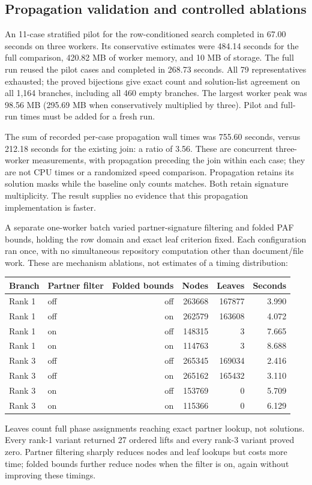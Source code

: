 \documentclass[11pt]{article}
\begin{document}
\subsection{Propagation validation and controlled ablations}
An 11-case stratified pilot for the row-conditioned search completed in
67.00 seconds on three workers. Its conservative estimates were 484.14
seconds for the full comparison, 420.82 MB of worker memory, and 10 MB of
storage. The full run reused the pilot cases and completed in 268.73 seconds.
All 79 representatives exhausted; the proved bijections give exact count
and solution-list agreement on all 1,164 branches, including all 460 empty
branches. The largest worker peak was 98.56 MB (295.69 MB when conservatively
multiplied by three). Pilot and full-run times must be added for a fresh run.

The sum of recorded per-case propagation wall times was 755.60 seconds,
versus 212.18 seconds for the existing join: a ratio of 3.56. These are
concurrent three-worker measurements, with propagation preceding the join
within each case; they are not CPU times or a randomized speed comparison.
Propagation retains its solution masks while the baseline only counts
matches. Both retain signature multiplicity. The result supplies no
evidence that this propagation implementation is faster.

A separate one-worker batch varied partner-signature filtering and folded
PAF bounds, holding the row domain and exact leaf criterion fixed. Each
configuration ran once, with no simultaneous repository computation other
than document/file work. These are mechanism ablations, not estimates of
a timing distribution:
\begin{center}
\begin{tabular}{llrrrr}
\toprule
Branch & Partner filter & Folded bounds & Nodes & Leaves & Seconds\\
\midrule
Rank 1 & off & off & 263668 & 167877 & 3.990\\
Rank 1 & off & on  & 262579 & 163608 & 4.072\\
Rank 1 & on  & off & 148315 & 3 & 7.665\\
Rank 1 & on  & on  & 114763 & 3 & 8.688\\
Rank 3 & off & off & 265345 & 169034 & 2.416\\
Rank 3 & off & on  & 265162 & 165432 & 3.110\\
Rank 3 & on  & off & 153769 & 0 & 5.709\\
Rank 3 & on  & on  & 115366 & 0 & 6.129\\
\bottomrule
\end{tabular}
\end{center}
Leaves count full phase assignments reaching exact partner lookup, not
solutions. Every rank-1 variant returned 27 ordered lifts and every rank-3
variant proved zero. Partner filtering sharply reduces nodes and leaf
lookups but costs more time; folded bounds further reduce nodes when the
filter is on, again without improving these timings.
\end{document}
